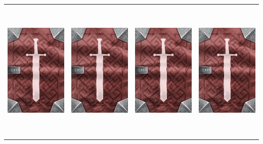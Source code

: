 \documentclass{minimal}
\begin{document}
{\begin{longtable}{llll}
\includegraphics[width=44mm,height=68mm]{./64-151/gh-113-skullbane-axe-back.png} &
\includegraphics[width=44mm,height=68mm]{./64-151/gh-112-ancient-drill-back.png} &
\includegraphics[width=44mm,height=68mm]{./64-151/gh-112-ancient-drill-back.png} &
\includegraphics[width=44mm,height=68mm]{./64-151/gh-111-wave-crest-back.png}\\ 

\end{longtable}}
\end{document}
